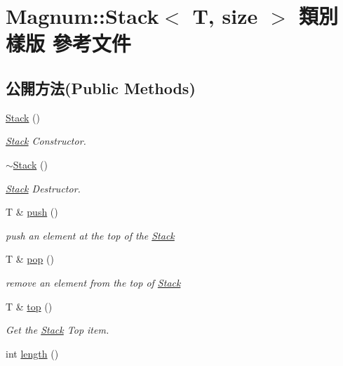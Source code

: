 \hypertarget{class_magnum_1_1_stack}{}\section{Magnum\+:\+:Stack$<$ T, size $>$ 類別 樣版 參考文件}
\label{class_magnum_1_1_stack}
\subsection*{公開方法(Public Methods)}
\begin{DoxyCompactItemize}
\item 
\hyperlink{class_magnum_1_1_stack_a99ed0fe6ccc0ebe7cb0dea23e7a8fe3a}{Stack} ()
\begin{DoxyCompactList}\small\item\em \hyperlink{class_magnum_1_1_stack}{Stack} Constructor. \end{DoxyCompactList}\item 
\hyperlink{class_magnum_1_1_stack_a9d6d2b66ad6b95a62f2679cf4937bbc5}{$\sim$\+Stack} ()
\begin{DoxyCompactList}\small\item\em \hyperlink{class_magnum_1_1_stack}{Stack} Destructor. \end{DoxyCompactList}\item 
T \& \hyperlink{class_magnum_1_1_stack_a4e421ee50e47cce35e054ba993ec4eff}{push} ()
\begin{DoxyCompactList}\small\item\em push an element at the top of the \hyperlink{class_magnum_1_1_stack}{Stack} \end{DoxyCompactList}\item 
T \& \hyperlink{class_magnum_1_1_stack_a82f84769b3f5e64b4031b1db5df5db72}{pop} ()
\begin{DoxyCompactList}\small\item\em remove an element from the top of \hyperlink{class_magnum_1_1_stack}{Stack} \end{DoxyCompactList}\item 
T \& \hyperlink{class_magnum_1_1_stack_a54b5f3376cb2b16e631b38a791dc495e}{top} ()
\begin{DoxyCompactList}\small\item\em Get the \hyperlink{class_magnum_1_1_stack}{Stack} Top item. \end{DoxyCompactList}\item 
int \hyperlink{class_magnum_1_1_stack_a89d6b8883d55221ef9b598759fd229d8}{length} ()

\end{DoxyCompactItemize}
